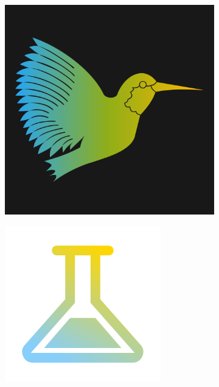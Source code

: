\documentclass[10pt,letterpaper,twocolumn]{article}
\begin{document}
\begin{figure}[!ht]
  \centering
  \begin{subfigure}[t]{0.5\textwidth}
    \centering
    \includegraphics[width=\linewidth]{"../../Images/latex"}
    \captionsetup{width=.8\linewidth}
    \caption[LaTeX Logo]{}
    \label{fig:oi}
  \end{subfigure}%
  \hfill
  \begin{subfigure}[t]{0.5\textwidth}
    \centering
    \includegraphics[width=\linewidth]{"../../Images/science"}

\end{subfigure}
\end{figure}
\end{document}
